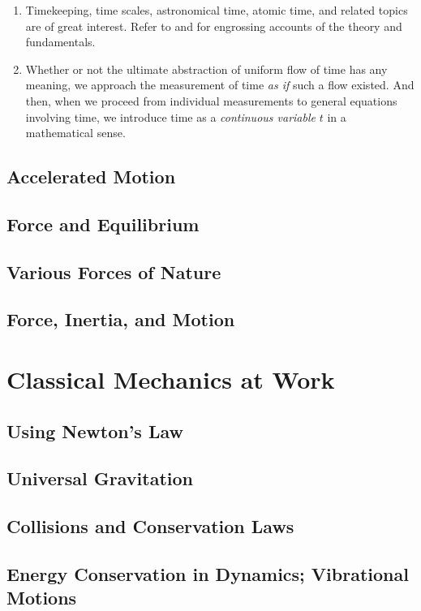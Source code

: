\documentclass[12pt,a4paper]{book}
\begin{document}
\begin{enumerate}
\begin{enumerate}
            \item Timekeeping, time scales, astronomical time, atomic time, and related topics are of great interest. Refer to \cite{sundials-atomic} and \cite{nbs-time-freq} for engrossing accounts of the theory and fundamentals.
            \item Whether or not the ultimate abstraction of uniform flow of time has any meaning, we approach the measurement of time \emph{as if} such a flow existed. And then, when we proceed from individual measurements to general equations involving time, we introduce time as a \emph{continuous variable} $t$ in a mathematical sense.
        \end{enumerate}
\end{enumerate}

\chapter{Accelerated Motion} \label{ch: 3-accelerated-motion}
\chapter{Force and Equilibrium} \label{ch: 4-force-equilibrium}
\chapter{Various Forces of Nature} \label{ch: 5-forces-of-nature}
\chapter{Force, Inertia, and Motion} \label{ch: 6-force-inertia-motion}
\part{Classical Mechanics at Work}
\chapter{Using Newton's Law} \label{ch: 7-newtons-law}
\chapter{Universal Gravitation}\label{ch: 8-universal-gravitation}
\chapter{Collisions and Conservation Laws} \label{ch: 9-collisions}
\chapter[Energy Conservation in Dynamics]{Energy Conservation in Dynamics; Vibrational Motions}\label{ch: 10-energy-conservation}
\end{document}
